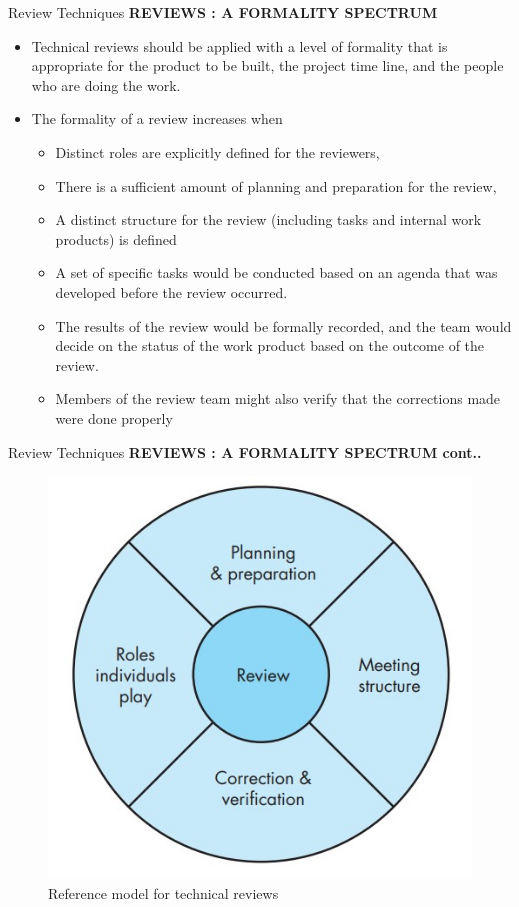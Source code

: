 \documentclass{beamer}
\begin{document}
\begin{frame}{Review Techniques}
\textbf{REVIEWS : A FORMALITY SPECTRUM}
\begin{itemize}
	\item Technical reviews should be applied with a level of formality that is 
	appropriate for the product to be built, the project time line, and the 
	people who are doing the work.
	\item The formality of a review increases when
	\begin{itemize}
		\item Distinct roles are explicitly defined for the reviewers,
		\item There is a sufficient amount of planning and preparation for 
		the review,
		\item A distinct structure for the review (including tasks and internal 
		work products) is defined
		\item A set of specific tasks would be conducted based on 
		an agenda that was developed before the review 
		occurred. 
		\item The results of the review would be formally 
		recorded, and the team would decide on the status of 
		the work product based on the outcome of the review.
		\item Members of the review team might also verify that 
		the corrections made were done properly
		
	\end{itemize}
\end{itemize}
\end{frame}
\begin{frame}{Review Techniques}
	\textbf{REVIEWS : A FORMALITY SPECTRUM cont..}
		\begin{figure}
		\includegraphics[scale=.4]{img/m3_22}
		\caption{Reference 
			model for 
			technical 
			reviews}
	\end{figure}
\end{frame}
\end{document}
